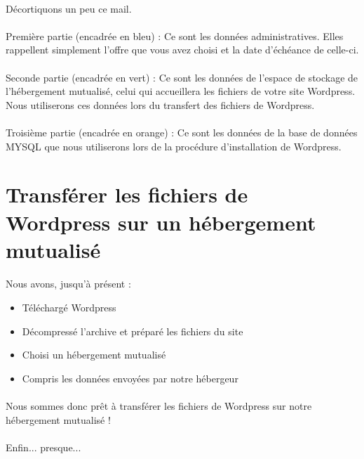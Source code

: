 \documentclass[10pt,a4paper]{article}
\begin{document}
\paragraph{}Décortiquons un peu ce mail.
\paragraph{}Première partie (encadrée en bleu) : Ce sont les données administratives. Elles rappellent simplement l'offre que vous avez choisi et la date d'échéance de celle-ci.
\paragraph{}Seconde partie (encadrée en vert) : Ce sont les données de l'espace de stockage de l'hébergement mutualisé, celui qui accueillera les fichiers de votre site Wordpress. Nous utiliserons ces données lors du transfert des fichiers de Wordpress.
\paragraph{}Troisième partie (encadrée en orange) : Ce sont les données de la base de données MYSQL que nous utiliserons lors de la procédure d'installation de Wordpress.
\newpage

\section{Transférer les fichiers de Wordpress sur un hébergement mutualisé}
\paragraph{}Nous avons, jusqu'à présent :
\begin{itemize}
\item Téléchargé Wordpress
\item Décompressé l'archive et préparé les fichiers du site
\item Choisi un hébergement mutualisé
\item Compris les données envoyées par notre hébergeur
\end{itemize}
\paragraph{}Nous sommes donc prêt à transférer les fichiers de Wordpress sur notre hébergement mutualisé !
\paragraph{}Enfin... presque...
\end{document}
